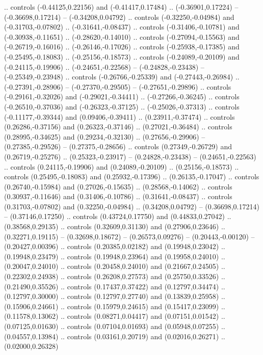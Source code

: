 {{.. controls (-0.44125,0.22156) and (-0.41417,0.17484) .. (-0.36901,0.17224)
-- (-0.36698,0.17214)
-- (-0.34208,0.04792)
.. controls (-0.32250,-0.04984) and (-0.31703,-0.07802) .. (-0.31641,-0.08437)
.. controls (-0.31406,-0.10781) and (-0.30938,-0.11651) .. (-0.28620,-0.14010)
.. controls (-0.27094,-0.15563) and (-0.26719,-0.16016) .. (-0.26146,-0.17026)
.. controls (-0.25938,-0.17385) and (-0.25495,-0.18083) .. (-0.25156,-0.18573)
.. controls (-0.24089,-0.20109) and (-0.24115,-0.19906) .. (-0.24651,-0.22568)
-- (-0.24828,-0.23438)
-- (-0.25349,-0.23948)
.. controls (-0.26766,-0.25339) and (-0.27443,-0.26984) .. (-0.27391,-0.28906)
-- (-0.27370,-0.29505)
-- (-0.27651,-0.29896)
.. controls (-0.29161,-0.32026) and (-0.29021,-0.34411) .. (-0.27266,-0.36245)
.. controls (-0.26510,-0.37036) and (-0.26323,-0.37125) .. (-0.25026,-0.37313)
.. controls (-0.11177,-0.39344) and (0.09406,-0.39411) .. (0.23911,-0.37474)
.. controls (0.26286,-0.37156) and (0.26323,-0.37146) .. (0.27021,-0.36484)
.. controls (0.28995,-0.34625) and (0.29234,-0.32130) .. (0.27656,-0.29906)
-- (0.27385,-0.29526)
-- (0.27375,-0.28656)
.. controls (0.27349,-0.26729) and (0.26719,-0.25276) .. (0.25323,-0.23917)
-- (0.24828,-0.23438)
-- (0.24651,-0.22563)
.. controls (0.24115,-0.19906) and (0.24089,-0.20109) .. (0.25156,-0.18573)
.. controls (0.25495,-0.18083) and (0.25932,-0.17396) .. (0.26135,-0.17047)
.. controls (0.26740,-0.15984) and (0.27026,-0.15635) .. (0.28568,-0.14062)
.. controls (0.30937,-0.11646) and (0.31406,-0.10786) .. (0.31641,-0.08437)
.. controls (0.31703,-0.07802) and (0.32250,-0.04984) .. (0.34208,0.04792)
-- (0.36698,0.17214)
-- (0.37146,0.17250)
.. controls (0.43724,0.17750) and (0.44833,0.27042) .. (0.38568,0.29135)
.. controls (0.32609,0.31130) and (0.27906,0.23646) .. (0.32271,0.19115)
-- (0.32698,0.18672)
-- (0.26573,0.09276)
-- (0.20443,-0.00120)
-- (0.20427,0.00396)
.. controls (0.20385,0.02182) and (0.19948,0.23042) .. (0.19948,0.23479)
.. controls (0.19948,0.23964) and (0.19958,0.24010) .. (0.20047,0.24010)
.. controls (0.20458,0.24010) and (0.21667,0.24505) .. (0.22302,0.24938)
.. controls (0.26208,0.27573) and (0.25750,0.33526) .. (0.21490,0.35526)
.. controls (0.17437,0.37422) and (0.12797,0.34474) .. (0.12797,0.30000)
.. controls (0.12797,0.27740) and (0.13839,0.25958) .. (0.15906,0.24661)
.. controls (0.15979,0.24615) and (0.15417,0.23099) .. (0.11578,0.13062)
.. controls (0.08271,0.04417) and (0.07151,0.01542) .. (0.07125,0.01630)
.. controls (0.07104,0.01693) and (0.05948,0.07255) .. (0.04557,0.13984)
.. controls (0.03161,0.20719) and (0.02016,0.26271) .. (0.02000,0.26328)
}}

